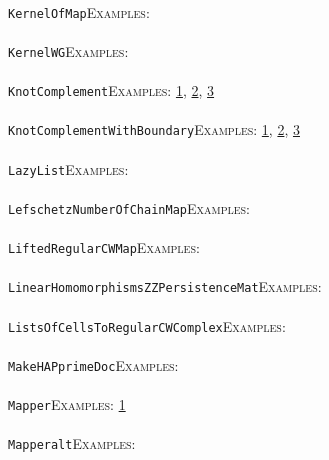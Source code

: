 \documentclass[a4paper,11pt]{report}
\begin{document}
{{ \\
 \texttt{KernelOfMap}{\nobreakspace}{\nobreakspace}{\nobreakspace}{\nobreakspace}\textsc{Examples:} \\
 \\
 \texttt{KernelWG}{\nobreakspace}{\nobreakspace}{\nobreakspace}{\nobreakspace}\textsc{Examples:} \\
 \\
 \texttt{KnotComplement}{\nobreakspace}{\nobreakspace}{\nobreakspace}{\nobreakspace}\textsc{Examples:} \href{tutorial/chap1.html} {1}{\nobreakspace}, \href{tutorial/chap3.html} {2}{\nobreakspace}, \href{../www/SideLinks/About/aboutCoverinSpaces.html} {3}{\nobreakspace} \\
 \\
 \texttt{KnotComplementWithBoundary}{\nobreakspace}{\nobreakspace}{\nobreakspace}{\nobreakspace}\textsc{Examples:} \href{tutorial/chap1.html} {1}{\nobreakspace}, \href{tutorial/chap3.html} {2}{\nobreakspace}, \href{../www/SideLinks/About/aboutCoverinSpaces.html} {3}{\nobreakspace} \\
 \\
 \texttt{LazyList}{\nobreakspace}{\nobreakspace}{\nobreakspace}{\nobreakspace}\textsc{Examples:} \\
 \\
 \texttt{LefschetzNumberOfChainMap}{\nobreakspace}{\nobreakspace}{\nobreakspace}{\nobreakspace}\textsc{Examples:} \\
 \\
 \texttt{LiftedRegularCWMap}{\nobreakspace}{\nobreakspace}{\nobreakspace}{\nobreakspace}\textsc{Examples:} \\
 \\
 \texttt{LinearHomomorphismsZZPersistenceMat}{\nobreakspace}{\nobreakspace}{\nobreakspace}{\nobreakspace}\textsc{Examples:} \\
 \\
 \texttt{ListsOfCellsToRegularCWComplex}{\nobreakspace}{\nobreakspace}{\nobreakspace}{\nobreakspace}\textsc{Examples:} \\
 \\
 \texttt{MakeHAPprimeDoc}{\nobreakspace}{\nobreakspace}{\nobreakspace}{\nobreakspace}\textsc{Examples:} \\
 \\
 \texttt{Mapper}{\nobreakspace}{\nobreakspace}{\nobreakspace}{\nobreakspace}\textsc{Examples:} \href{tutorial/chap4.html} {1}{\nobreakspace} \\
 \\
 \texttt{Mapper{\textunderscore}alt}{\nobreakspace}{\nobreakspace}{\nobreakspace}{\nobreakspace}\textsc{Examples:} \\
}}
\end{document}
